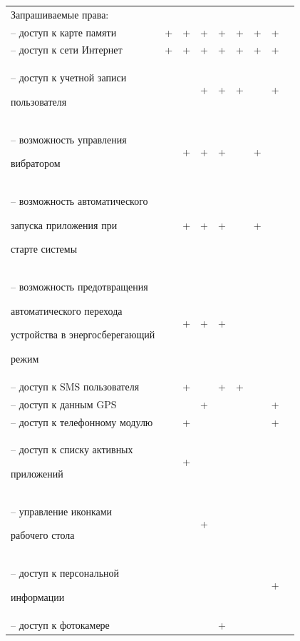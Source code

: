 \begin{table} [h!]
{\begin{tabular}{| m{6.6cm} | c | c | c | c | c | c | c | c |}
      Запрашиваемые права:
      & & & & & & & & \\

      -- доступ к карте памяти
      & +
      & +
      & +
      & +
      & +
      & +
      & +
      & \\

      -- доступ к сети Интернет
      & +
      & +
      & +
      & +
      & +
      & +
      & +
      & \\

      -- доступ к учетной записи \par пользователя
      &
      &
      & +
      & +
      & +
      &
      & +
      & \\

      -- возможность управления \par вибратором
      &
      & +
      & +
      & +
      &
      & +
      &
      & \\

      -- возможность автоматического \par запуска приложения при \par старте системы
      &
      & +
      & +
      & +
      &
      & +
      &
      & \\

      -- возможность предотвращения \par
      автоматического перехода \par
      устройства в энергосберегающий \par
      режим
      &
      & +
      & +
      & +
      &
      &
      &
      & \\

      -- доступ к SMS пользователя
      &
      & +
      &
      & +
      & +
      &
      &
      & \\

      -- доступ к данным GPS
      &
      &
      & +
      &
      &
      &
      & +
      & \\

      -- доступ к телефонному модулю
      &
      & +
      &
      &
      &
      &
      & +
      & \\

      -- доступ к списку активных \par приложений
      &
      & +
      &
      &
      &
      &
      &
      & \\

      -- управление иконками \par рабочего стола
      &
      &
      & +
      &
      &
      &
      &
      & \\

      -- доступ к персональной \par информации
      &
      &
      &
      &
      &
      &
      & +
      & \\

      -- доступ к фотокамере
      &
      &
      &
      & +
      &
      &
      &
      & \\
      \hline
    \end{tabular}
  }
\end{table}
